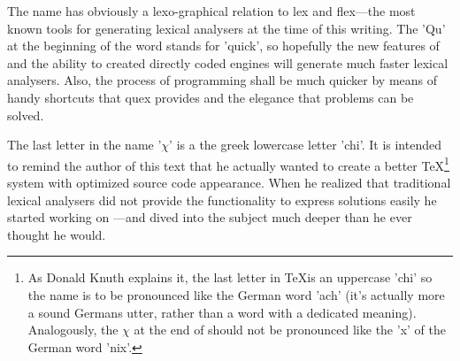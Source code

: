 The name {\quex} has obviously a lexo-graphical relation to lex and flex---the most
known tools for generating lexical analysers at the time of this writing.  The
'Qu' at the beginning of the word stands for 'quick', so hopefully the new
features of {\quex} and the ability to created directly coded engines will
generate much faster lexical analysers. Also, the process of programming shall
be much quicker by means of handy shortcuts that quex provides and the elegance that
problems can be solved. 

The last letter in the name '$\chi$' is a the greek lowercase letter 'chi'.  It
is intended to remind the author of this text that he actually wanted to create
a better \TeX\footnote{As Donald Knuth explains it\cite{}, the last letter in
\TeX is an uppercase 'chi' so the name is to be pronounced like the German
word 'ach' (it's actually more a sound Germans utter, rather than a word with 
a dedicated meaning). Analogously, the $\chi$ at the end of {\quex} should not 
be pronounced like the 'x' of the German word 'nix'.} system with optimized source code appearance. When he
realized that traditional lexical analysers did not provide the
functionality to express solutions easily he started working on
{\quex}---and dived into the subject much deeper than he ever thought he would. 



